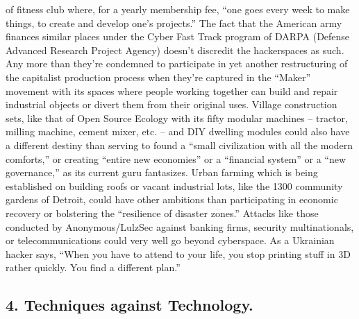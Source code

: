 \documentclass[landscape,twocolumn,letterpaper]{article}
\begin{document}
of fitness club where, for a yearly membership fee, “one goes every
week to make things, to create and develop one’s projects.” The fact
that the American army finances similar places under the Cyber Fast
Track program of DARPA (Defense Advanced Research Project Agency)
doesn’t discredit the hackerspaces as such. Any more than they’re
condemned to participate in yet another restructuring of the
capitalist production process when they’re captured in the “Maker”
movement with its spaces where people working together can build and
repair industrial objects or divert them from their original
uses. Village construction sets, like that of Open Source Ecology with
its fifty modular machines – tractor, milling machine, cement mixer,
etc. – and DIY dwelling modules could also have a different destiny
than serving to found a “small civilization with all the modern
comforts,” or creating “entire new economies” or a “financial system”
or a “new governance,” as its current guru fantasizes. Urban farming
which is being established on building roofs or vacant industrial
lots, like the 1300 community gardens of Detroit, could have other
ambitions than participating in economic recovery or bolstering the
“resilience of disaster zones.” Attacks like those conducted by
Anonymous/LulzSec against banking firms, security multinationals, or
telecommunications could very well go beyond cyberspace. As a
Ukrainian hacker says, “When you have to attend to your life, you stop
printing stuff in 3D rather quickly. You find a different plan.”

\subsection*{4. Techniques against Technology.}
\end{document}
